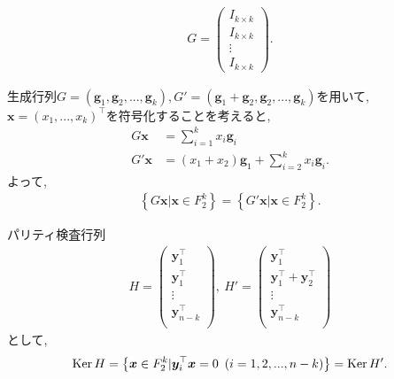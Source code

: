 \begin{ex}
    \label{ex10.14}
    \begin{align*}
        G =
        \begin{pmatrix}
            I_{k \times k} \\
            I_{k \times k} \\
            \vdots         \\
            I_{k \times k}
        \end{pmatrix}.
    \end{align*}
\end{ex}

\begin{ex}
    \label{ex10.15}
    生成行列$G = \left( \bm{g}_1, \bm{g}_2, ... ,  \bm{g}_k\right), G' = \left( \bm{g}_1 +
        \bm{g}_2, \bm{g}_2, ... ,  \bm{g}_k\right)$を用いて, $\bm{x} = \left( x_1 , ..., x_k\right)^\top$を符号化することを考えると,
    \begin{align*}
        G \bm{x}  & = \sum_{i=1}^k x_i \bm{g}_i                                    \\
        G' \bm{x} & = \left(x_1 + x_2\right) \bm{g}_1 + \sum_{i=2}^k x_i \bm{g}_i.
    \end{align*}
    よって,
    \begin{align*}
        \left\{ G \bm{x} | \bm{x} \in F_2^k \right\} = \left\{ G' \bm{x} | \bm{x} \in F_2^k \right\}.
    \end{align*}
\end{ex}

\begin{ex}
    \label{ex10.16}
    パリティ検査行列
    \begin{align*}
        H =
        \begin{pmatrix}
            \bm{y}_1^\top     \\
            \bm{y}_1^\top     \\
            \vdots            \\
            \bm{y}_{n-k}^\top \\
        \end{pmatrix},\
        H' =
        \begin{pmatrix}
            \bm{y}_1^\top                 \\
            \bm{y}_1^\top + \bm{y}_2^\top \\
            \vdots                        \\
            \bm{y}_{n-k}^\top             \\
        \end{pmatrix}
    \end{align*}
    として,
    \begin{align*}
        \Ker{H} = \left\{ \bm{x} \in F_2^k | \bm{y}_i^\top \bm{x} = 0 \ \left( i = 1, 2, ... , n-k\right)\right\} = \Ker{H'}.
    \end{align*}
\end{ex}

